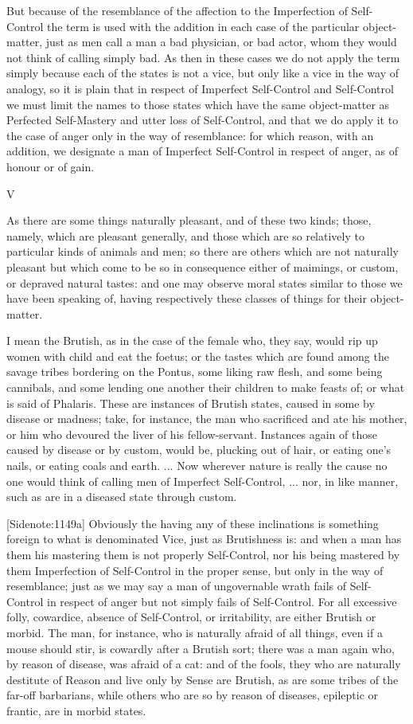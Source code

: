 But because of the resemblance of the affection to the Imperfection of
Self-Control the term is used with the addition in each case of the
particular object-matter, just as men call a man a bad physician, or bad
actor, whom they would not think of calling simply bad. As then in these
cases we do not apply the term simply because each of the states is not
a vice, but only like a vice in the way of analogy, so it is plain that
in respect of Imperfect Self-Control and Self-Control we must limit the
names to those states which have the same object-matter as Perfected
Self-Mastery and utter loss of Self-Control, and that we do apply it to
the case of anger only in the way of resemblance: for which reason, with
an addition, we designate a man of Imperfect Self-Control in respect of
anger, as of honour or of gain.

V

As there are some things naturally pleasant, and of these two kinds;
those, namely, which are pleasant generally, and those which are so
relatively to particular kinds of animals and men; so there are others
which are not naturally pleasant but which come to be so in consequence
either of maimings, or custom, or depraved natural tastes: and one may
observe moral states similar to those we have been speaking of, having
respectively these classes of things for their object-matter.

I mean the Brutish, as in the case of the female who, they say, would
rip up women with child and eat the foetus; or the tastes which are
found among the savage tribes bordering on the Pontus, some liking raw
flesh, and some being cannibals, and some lending one another their
children to make feasts of; or what is said of Phalaris. These are
instances of Brutish states, caused in some by disease or madness; take,
for instance, the man who sacrificed and ate his mother, or him who
devoured the liver of his fellow-servant. Instances again of those
caused by disease or by custom, would be, plucking out of hair, or
eating one's nails, or eating coals and earth. ... Now wherever nature
is really the cause no one would think of calling men of Imperfect
Self-Control, ... nor, in like manner, such as are in a diseased state
through custom.

[Sidenote:1149a] Obviously the having any of these inclinations is
something foreign to what is denominated Vice, just as Brutishness is:
and when a man has them his mastering them is not properly Self-Control,
nor his being mastered by them Imperfection of Self-Control in the
proper sense, but only in the way of resemblance; just as we may say a
man of ungovernable wrath fails of Self-Control in respect of anger but
not simply fails of Self-Control. For all excessive folly, cowardice,
absence of Self-Control, or irritability, are either Brutish or morbid.
The man, for instance, who is naturally afraid of all things, even if
a mouse should stir, is cowardly after a Brutish sort; there was a man
again who, by reason of disease, was afraid of a cat: and of the fools,
they who are naturally destitute of Reason and live only by Sense are
Brutish, as are some tribes of the far-off barbarians, while others
who are so by reason of diseases, epileptic or frantic, are in morbid
states.

